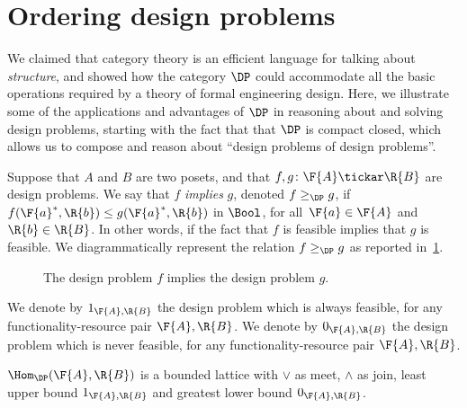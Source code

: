 \section{Ordering design problems}

We claimed that category theory is an efficient language for talking about \emph{structure}, and showed how the category $\DP$ could accommodate all the basic operations required by a theory of formal engineering design. Here, we illustrate some of the applications and advantages of $\DP$ in reasoning about and solving design problems, starting with the fact that that $\DP$ is compact closed, which allows us to compose and reason about ``design problems of design problems''.

\begin{definition}[Order on $\DP$]
\label{def:DP_loc_pos}

Suppose that $A$ and $B$ are two posets, and that $f,g \colon \F{A} \tickar \R{B}$ are design problems. We say that $f$ \emph{implies} $g$, denoted $f \geq_{\DP} g$, if $f(\F{a}^*,\R{b}) \leq g(\F{a}^*,\R{b} )$ in $\Bool$, for all~$\F{a} \in \F{A}$
and~$\R{b} \in \R{B}$. In other words, if the fact that $f$ is feasible implies that $g$ is feasible. We diagrammatically represent the relation $f \geq_{\DP} g$ as reported in~\cref{fig:dpimplies}.

\begin{figure}[h!]
\begin{center}
\end{center}
\caption{The design problem $f$ implies the design problem $g$. \label{fig:dpimplies}}
\end{figure}
\end{definition}

\begin{remark}
We denote by $1_{\F{A},\R{B}}$ the design problem which is always feasible, for any functionality-resource pair $\F{A},\R{B}$. We denote by $0_{\F{A},\R{B}}$ the design problem which is never feasible, for any functionality-resource pair $\F{A},\R{B}$.
\end{remark}
\begin{lemma}
\label{lemma:dpboundedlattice}
$\Hom_\DP(\F{A},\R{B})$ is a bounded lattice with $\vee$ as meet, $\wedge$ as join, least upper bound  $1_{\F{A},\R{B}}$ and greatest lower bound $0_{\F{A},\R{B}}$.
\end{lemma}

